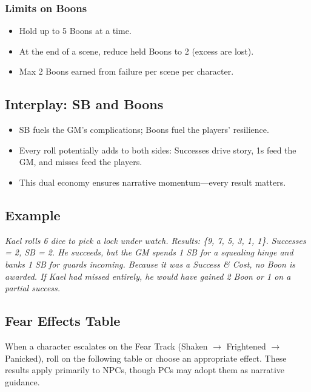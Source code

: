 \subsubsection{Limits on Boons}
\begin{itemize}
  \item Hold up to 5 Boons at a time.
  \item At the end of a scene, reduce held Boons to 2 (excess are lost).
  \item Max 2 Boons earned from failure per scene per character.
\end{itemize}

\subsection{Interplay: SB and Boons}
\begin{itemize}
  \item SB fuels the GM’s complications; Boons fuel the players’ resilience.
  \item Every roll potentially adds to both sides: Successes drive story, 1s feed the GM, and misses feed the players.
  \item This dual economy ensures narrative momentum—every result matters.
\end{itemize}

\subsection{Example}
\emph{Kael rolls 6 dice to pick a lock under watch. Results: \{9, 7, 5, 3, 1, 1\}. Successes = 2, SB = 2. He succeeds, but the GM spends 1 SB for a squealing hinge and banks 1 SB for guards incoming. Because it was a Success \& Cost, no Boon is awarded. If Kael had missed entirely, he would have gained 2 Boon or 1 on a partial success.}

\subsection{Fear Effects Table}
\label{subsec:fear-table}

When a character escalates on the Fear Track (Shaken $\rightarrow$ Frightened $\rightarrow$ Panicked), roll on the following table or choose an appropriate effect. These results apply primarily to NPCs, though PCs may adopt them as narrative guidance.

